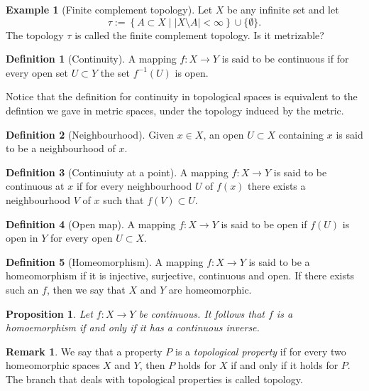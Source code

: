 \documentclass[11pt,a4paper]{article}
\theoremstyle{definition}
\newtheorem{definition}{Definition}[section]
\newtheorem{remark}{Remark}[section]
\newtheorem{example}{Example}[section]
\theoremstyle{plain}
\newtheorem{proposition}[theorem]{Proposition}
\newcommand{\set}[2]{ \left\{ #1 \mid #2 \right\} }
\newcommand{\abs}[1]{\left\lvert #1\right\rvert}
\begin{document}
  \begin{example}[Finite complement topology]
    Let $X$ be any infinite set and let 
    \[
      \tau := \set{A \subset X}{\abs{X \setminus A} < \infty} \cup
      \{\emptyset\}.
    \]
    The topology $\tau$ is called the finite complement topology. Is it 
    metrizable?
  \end{example}

  \begin{definition}[Continuity]
    A mapping $f \colon X \to Y$ is said to be continuous if for every open
    set $U \subset Y$ the set $f^{-1}(U)$ is open.
  \end{definition}

  Notice that the definition for continuity in topological spaces is equivalent
  to the defintion we gave in metric spaces, under the topology induced by
  the metric.

  \begin{definition}[Neighbourhood]
    Given $x \in X$, an open $U \subset X$ containing $x$ is said to be a
    neighbourhood of $x$.
  \end{definition}

  \begin{definition}[Continuiuty at a point]
    A mapping $f \colon X \to Y$ is said to be continuous at $x$ if for 
    every neighbourhood $U$ of $f(x)$ there exists a neighbourhood $V$
    of $x$ such that $f(V) \subset U$.
  \end{definition}

  \begin{definition}[Open map]
    A mapping $f \colon X \to Y$ is said to be open if $f(U)$ is open in $Y$
    for every open $U \subset X$.
  \end{definition}

  \begin{definition}[Homeomorphism]
    A mapping $f \colon X \to Y$ is said to be a homeomorphism if it is
    injective, surjective, continuous and open. If there exists such an $f$, 
    then we say that $X$ and $Y$ are homeomorphic.
  \end{definition}

  \begin{proposition}
    Let $f \colon X \to Y$ be continuous. It follows that $f$ is a 
    homoemorphism if and only if it has a continuous inverse.
  \end{proposition}

  \begin{remark}
    We say that a property $P$ is a \emph{topological property} if for every
    two homeomorphic spaces $X$ and $Y$, then $P$ holds for $X$ if and only
    if it holds for $P$. The branch that deals with topological properties
    is called topology.
  \end{remark}
\end{document}
